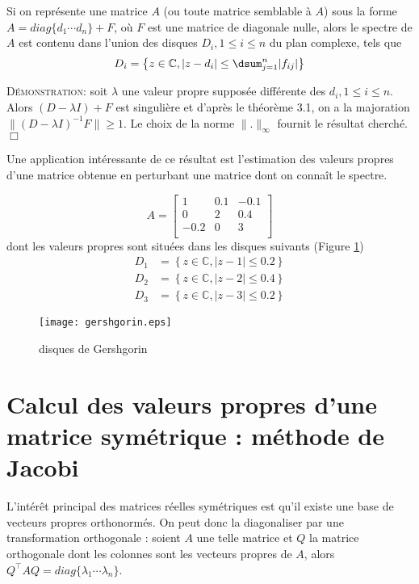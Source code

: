 \begin{theo} 
Si on représente une matrice $A$ (ou toute matrice semblable à $A$) sous la forme $A=diag\{d_1\cdots d_n\}+F$, où $F$ est une matrice de diagonale nulle, alors le spectre de $A$ est contenu dans l'union des disques $D_i,1\leq i\leq n$ du plan complexe, tels que 
$$D_i=\left \{ z\in \mathbb{C}, |z-d_i|\leq \dsum_{j=1}^n|f_{ij}|\right \}$$
\end{theo}

\textsc{Démonstration:} soit $\lambda$ une valeur propre supposée différente des $d_i,1\leq i\leq n$. Alors $(D-\lambda I)+F$ est singulière et d'après le théorème 3.1, on a la majoration $\|(D-\lambda I)^{-1}F \|\geq 1$. Le choix de la norme $\|.\|_{\infty}$ 
fournit le résultat cherché.\hfill$\Box$

Une application intéressante de ce résultat est l'estimation des valeurs propres d'une matrice obtenue en perturbant une matrice dont on connaît le spectre.

\begin{exemple} 
$$A =
\left[
\begin{array}{ccc}
1&0.1&-0.1\\
0&2&0.4\\
-0.2&0&3\\
\end{array}
\right]
$$ 
dont les valeurs propres sont situées dans les disques suivants (Figure \ref{51})
\begin{align*}
D_1&=\left \{ z\in \mathbb{C}, |z-1|\leq 0.2\right\}\\
D_2&=\left \{ z\in \mathbb{C}, |z-2|\leq 0.4\right\}\\
D_3&=\left \{ z\in \mathbb{C}, |z-3|\leq 0.2\right\}
\end{align*}
\end{exemple}

\begin{figure}[H]
\begin{center}
	\texttt{[image: gershgorin.eps]}
\end{center}
\caption{disques de Gershgorin}
\label{51}
\end{figure}

\section{Calcul des valeurs propres d'une matrice symétrique : méthode de Jacobi}
L'intérêt principal des matrices réelles symétriques est qu'il existe une base de vecteurs propres orthonormés. On peut donc la diagonaliser par une transformation orthogonale : soient $A$ une telle matrice et $Q$ la matrice orthogonale dont les colonnes sont les vecteurs propres de $A$, alors $Q^\top AQ=diag\{\lambda_1\cdots \lambda_n\}$.


